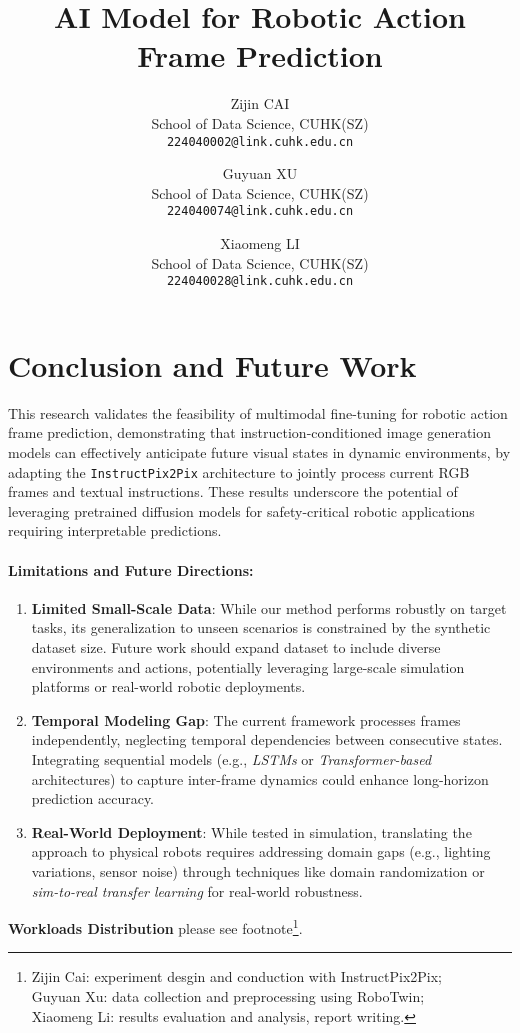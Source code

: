 \documentclass[10pt,twocolumn,letterpaper]{article}
\title{AI Model for Robotic Action Frame Prediction}
\author{Zijin CAI\\
School of Data Science, CUHK(SZ)\\
{\tt\small 224040002@link.cuhk.edu.cn}
\and 
Guyuan XU\\
School of Data Science, CUHK(SZ)\\
{\tt\small 224040074@link.cuhk.edu.cn}
\and
Xiaomeng LI\\
School of Data Science, CUHK(SZ)\\
{\tt\small 224040028@link.cuhk.edu.cn}
}
\begin{document}
\maketitle
    



\section{Conclusion and Future Work}

This research validates the feasibility of multimodal fine-tuning for robotic action frame prediction, 
    demonstrating that instruction-conditioned image generation models 
can effectively anticipate future visual states in dynamic environments,
    by adapting the \texttt{InstructPix2Pix} architecture to jointly process current RGB frames and textual instructions. 
These results underscore the potential of leveraging pretrained diffusion models 
    for safety-critical robotic applications requiring interpretable predictions.

\paragraph{Limitations and Future Directions:}
\begin{enumerate}
    \item \textbf{Limited Small-Scale Data}: 
    While our method performs robustly on target tasks, 
        its generalization to unseen scenarios is constrained by the synthetic dataset size. 
    Future work should expand dataset to include diverse environments and actions, 
        potentially leveraging large-scale simulation platforms or real-world robotic deployments.
    \item \textbf{Temporal Modeling Gap}: 
    The current framework processes frames independently, neglecting temporal dependencies between consecutive states. 
    Integrating sequential models (e.g., \textit{LSTMs} or \textit{Transformer-based} architectures) 
        to capture inter-frame dynamics could enhance long-horizon prediction accuracy.
    \item \textbf{Real-World Deployment}: 
    While tested in simulation, translating the approach to physical robots requires addressing domain gaps 
        (e.g., lighting variations, sensor noise) through techniques like domain randomization 
            or \textit{sim-to-real transfer learning} for real-world robustness.
\end{enumerate}
\noindent
\textbf{Workloads Distribution} please see footnote\footnote{
    Zijin Cai: experiment desgin and conduction with InstructPix2Pix; \\
    Guyuan Xu: data collection and preprocessing using RoboTwin; \\
    Xiaomeng Li: results evaluation and analysis, report writing.}.







\end{document}
